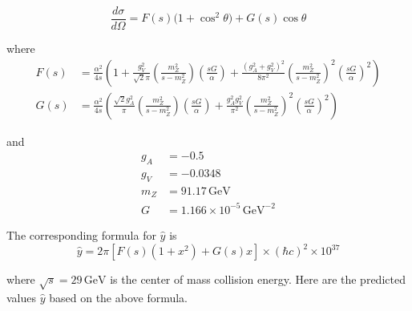 \documentclass[12pt]{article}
\begin{document}
\begin{equation*}
\frac{d\sigma}{d\Omega}=F(s)\bigl(1+\cos^2\theta\bigr)+G(s)\cos\theta
\end{equation*}

where
\begin{align*}
F(s)&=\frac{\alpha^2}{4s}
\left(
1+\frac{g_V^2}{\sqrt{2}\pi}\left(\frac{m_Z^2}{s-m_Z^2}\right)\left(\frac{sG}{\alpha}\right)
+\frac{(g_A^2+g_V^2)^2}{8\pi^2}\left(\frac{m_Z^2}{s-m_Z^2}\right)^2\left(\frac{sG}{\alpha}\right)^2
\right)
\\
G(s)&=\frac{\alpha^2}{4s}
\left(
\frac{\sqrt{2}g_A^2}{\pi}\left(\frac{m_Z^2}{s-m_Z^2}\right)\left(\frac{sG}{\alpha}\right)
+\frac{g_A^2g_V^2}{\pi^2}\left(\frac{m_Z^2}{s-m_Z^2}\right)^2\left(\frac{sG}{\alpha}\right)^2
\right)
\end{align*}

and
\begin{align*}
g_A&=-0.5
\\
g_V&=-0.0348
\\
m_Z&=91.17\,\text{GeV}
\\
G&=1.166\times10^{-5}\,\text{GeV}^{-2}
\end{align*}

The corresponding formula for $\hat{y}$ is
\begin{equation*}
\hat{y}=2\pi\left[F(s)(1+x^2)+G(s)x\right]\times(\hbar c)^2\times10^{37}
\end{equation*}

where $\sqrt{s}=29\,\text{GeV}$ is the center of mass collision energy.
Here are the predicted values $\hat{y}$ based on the above formula.
\end{document}

